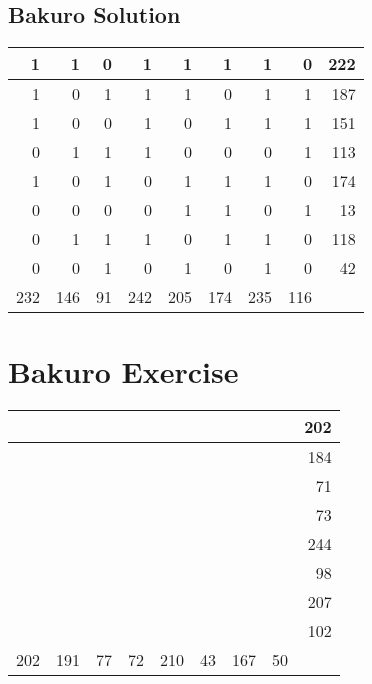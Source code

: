 \documentclass[]{article}
\begin{document}
 \subsection{Bakuro Solution} 
\begin{tabular}{rrrrrrrrr}
\hline
   1 &   1 &  0 &   1 &   1 &   1 &   1 &   0 & 222 \\ \hline
   1 &   0 &  1 &   1 &   1 &   0 &   1 &   1 & 187 \\ \hline
   1 &   0 &  0 &   1 &   0 &   1 &   1 &   1 & 151 \\ \hline
   0 &   1 &  1 &   1 &   0 &   0 &   0 &   1 & 113 \\ \hline
   1 &   0 &  1 &   0 &   1 &   1 &   1 &   0 & 174 \\ \hline
   0 &   0 &  0 &   0 &   1 &   1 &   0 &   1 &  13 \\ \hline
   0 &   1 &  1 &   1 &   0 &   1 &   1 &   0 & 118 \\ \hline
   0 &   0 &  1 &   0 &   1 &   0 &   1 &   0 &  42 \\ \hline
 232 & 146 & 91 & 242 & 205 & 174 & 235 & 116 &     \\ \hline
\hline
\end{tabular}\newpage\section{Bakuro Exercise}\begin{tabular}{rrrrrrrrr}
\hline
     &     &    &    &     &    &     &    & 202 \\ \hline
     &     &    &    &     &    &     &    & 184 \\ \hline
     &     &    &    &     &    &     &    &  71 \\ \hline
     &     &    &    &     &    &     &    &  73 \\ \hline
     &     &    &    &     &    &     &    & 244 \\ \hline
     &     &    &    &     &    &     &    &  98 \\ \hline
     &     &    &    &     &    &     &    & 207 \\ \hline
     &     &    &    &     &    &     &    & 102 \\ \hline
 202 & 191 & 77 & 72 & 210 & 43 & 167 & 50 &     \\ \hline
\hline
\end{tabular}\newpage 
\end{document}
